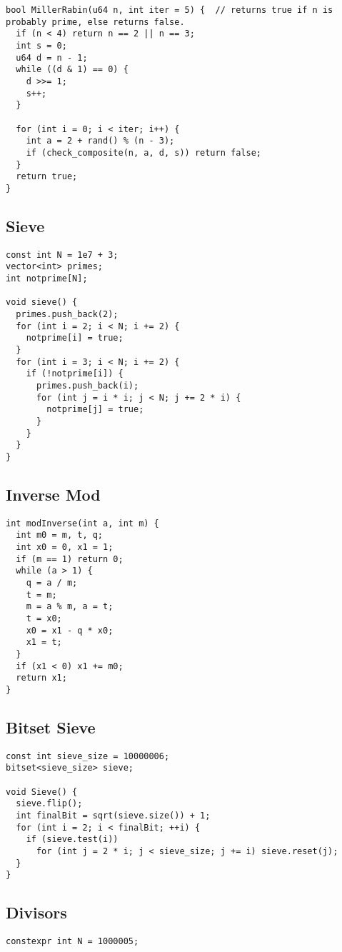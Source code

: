 \documentclass[10pt, a4paper]{article}
\begin{document}
\begin{multicols}{2}
\begin{lstlisting}
bool MillerRabin(u64 n, int iter = 5) {  // returns true if n is probably prime, else returns false.
  if (n < 4) return n == 2 || n == 3;
  int s = 0;
  u64 d = n - 1;
  while ((d & 1) == 0) {
    d >>= 1;
    s++;
  }

  for (int i = 0; i < iter; i++) {
    int a = 2 + rand() % (n - 3);
    if (check_composite(n, a, d, s)) return false;
  }
  return true;
}
\end{lstlisting}
\subsection{Sieve}
\begin{lstlisting}
const int N = 1e7 + 3;
vector<int> primes;
int notprime[N];

void sieve() {
  primes.push_back(2);
  for (int i = 2; i < N; i += 2) {
    notprime[i] = true;
  }
  for (int i = 3; i < N; i += 2) {
    if (!notprime[i]) {
      primes.push_back(i);
      for (int j = i * i; j < N; j += 2 * i) {
        notprime[j] = true;
      }
    }
  }
} 
\end{lstlisting}
\subsection{Inverse Mod}
\begin{lstlisting}
int modInverse(int a, int m) {
  int m0 = m, t, q;
  int x0 = 0, x1 = 1;
  if (m == 1) return 0;
  while (a > 1) {
    q = a / m;
    t = m;
    m = a % m, a = t;
    t = x0;
    x0 = x1 - q * x0;
    x1 = t;
  }
  if (x1 < 0) x1 += m0;
  return x1;
}
\end{lstlisting}
\subsection{Bitset Sieve}
\begin{lstlisting}
const int sieve_size = 10000006;
bitset<sieve_size> sieve;

void Sieve() {
  sieve.flip();
  int finalBit = sqrt(sieve.size()) + 1;
  for (int i = 2; i < finalBit; ++i) {
    if (sieve.test(i))
      for (int j = 2 * i; j < sieve_size; j += i) sieve.reset(j);
  }
}
\end{lstlisting}
\subsection{Divisors}
\begin{lstlisting}
constexpr int N = 1000005;


\end{lstlisting}
\end{multicols}
\end{document}
